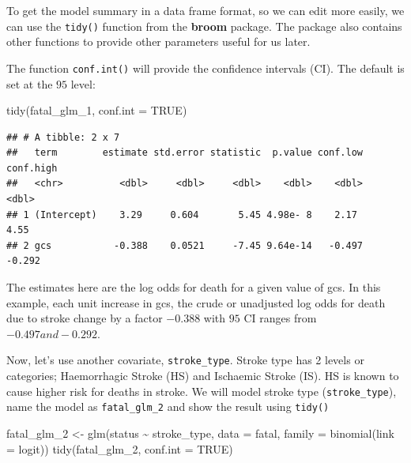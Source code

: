 \documentclass[
  10pt,
]{krantz}
\newenvironment{Shaded}{\begin{snugshade}}{\end{snugshade}}
\newcommand{\AttributeTok}[1]{\textcolor[rgb]{0.77,0.63,0.00}{#1}}
\newcommand{\ConstantTok}[1]{\textcolor[rgb]{0.00,0.00,0.00}{#1}}
\newcommand{\FunctionTok}[1]{\textcolor[rgb]{0.00,0.00,0.00}{#1}}
\newcommand{\NormalTok}[1]{#1}
\newcommand{\OtherTok}[1]{\textcolor[rgb]{0.56,0.35,0.01}{#1}}
\newcommand{\SpecialCharTok}[1]{\textcolor[rgb]{0.00,0.00,0.00}{#1}}
\newcommand{\StringTok}[1]{\textcolor[rgb]{0.31,0.60,0.02}{#1}}
\begin{document}
To get the model summary in a data frame format, so we can edit more easily, we can use the \texttt{tidy()} function from the \textbf{broom} package. The package also contains other functions to provide other parameters useful for us later.

The function \texttt{conf.int()} will provide the confidence intervals (CI). The default is set at the \(95%
\) level:

\begin{Shaded}
\begin{Highlighting}[]
\FunctionTok{tidy}\NormalTok{(fatal\_glm\_1, }\AttributeTok{conf.int =} \ConstantTok{TRUE}\NormalTok{)}
\end{Highlighting}
\end{Shaded}

\begin{verbatim}
## # A tibble: 2 x 7
##   term        estimate std.error statistic  p.value conf.low conf.high
##   <chr>          <dbl>     <dbl>     <dbl>    <dbl>    <dbl>     <dbl>
## 1 (Intercept)    3.29     0.604       5.45 4.98e- 8    2.17      4.55 
## 2 gcs           -0.388    0.0521     -7.45 9.64e-14   -0.497    -0.292
\end{verbatim}

The estimates here are the log odds for death for a given value of gcs. In this example, each unit increase in gcs, the crude or unadjusted log odds for death due to stroke change by a factor \(-0.388\) with \(95%
\) CI ranges from \(-0.497 and -0.292\).

Now, let's use another covariate, \texttt{stroke\_type}. Stroke type has 2 levels or categories; Haemorrhagic Stroke (HS) and Ischaemic Stroke (IS). HS is known to cause higher risk for deaths in stroke. We will model stroke type (\texttt{stroke\_type}), name the model as \texttt{fatal\_glm\_2} and show the result using \texttt{tidy()}

\begin{Shaded}
\begin{Highlighting}[]
\NormalTok{fatal\_glm\_2 }\OtherTok{\textless{}{-}} 
  \FunctionTok{glm}\NormalTok{(status }\SpecialCharTok{\textasciitilde{}}\NormalTok{ stroke\_type, }
      \AttributeTok{data =}\NormalTok{ fatal, }
      \AttributeTok{family =} \FunctionTok{binomial}\NormalTok{(}\AttributeTok{link =} \StringTok{\textquotesingle{}logit\textquotesingle{}}\NormalTok{))}
\FunctionTok{tidy}\NormalTok{(fatal\_glm\_2, }\AttributeTok{conf.int =} \ConstantTok{TRUE}\NormalTok{)}
\end{Highlighting}
\end{Shaded}
\end{document}
